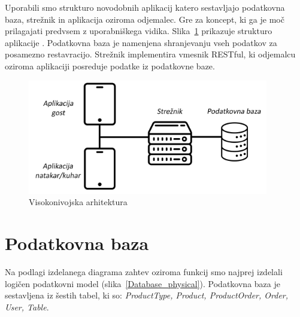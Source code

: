 \documentclass[a4paper, 12pt]{book}
\begin{document}
Uporabili smo strukturo novodobnih aplikacij katero sestavljajo podatkovna baza, strežnik in aplikacija oziroma odjemalec. Gre za koncept, ki ga je moč prilagajati predvsem z uporabniškega vidika. Slika~\ref{StrukApk} prikazuje strukturo aplikacije \cite{TRINIVO}.
Podatkovna baza je namenjena shranjevanju vseh podatkov za posamezno restavracijo. Strežnik implementira vmesnik RESTful, ki odjemalcu oziroma aplikaciji posreduje podatke iz podatkovne baze. 

\begin{figure}[!htb]
\centering
\includegraphics[width=10.5cm]{Skica1-new.png}
\caption{Visokonivojska arhitektura}
\label{StrukApk}
\end{figure}



\section{Podatkovna baza}
Na podlagi izdelanega diagrama zahtev oziroma funkcij smo najprej izdelali logičen podatkovni model (slika~\ref{Database_physical}). Podatkovna baza je sestavljena iz šestih tabel, ki so: \textit{ProductType, Product, ProductOrder, Order, User, Table}. 
\end{document}
